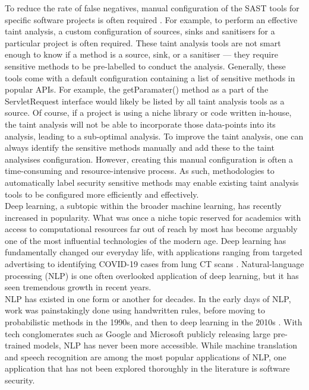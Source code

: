 \noindent
To reduce the rate of false negatives, manual configuration of the SAST tools for specific software projects is often required \cite{ZampettiFiorella2017HOSP}. For example, to perform an effective taint analysis, a custom configuration of sources, sinks and sanitisers for a particular project is often required. These taint analysis tools are not smart enough to know if a method is a source, sink, or a sanitiser --- they require sensitive methods to be pre-labelled to conduct the analysis. Generally, these tools come with a default configuration containing a list of sensitive methods in popular APIs. For example, the getParamater() method as a part of the ServletRequest interface would likely be listed by all taint analysis tools as a source. Of course, if a project is using a niche library or code written in-house, the taint analysis will not be able to incorporate those data-points into its analysis, leading to a sub-optimal analysis. To improve the taint analysis, one can always identify the sensitive methods manually and add these to the taint analysises configuration. However, creating this manual configuration is often a time-consuming and resource-intensive process. As such, methodologies to automatically label security sensitive methods may enable existing taint analysis tools to be configured more efficiently and effectively.\\

\noindent
Deep learning, a subtopic within the broader machine learning, has recently increased in popularity. What was once a niche topic reserved for academics with access to computational resources far out of reach by most has become arguably one of the most influential technologies of the modern age. Deep learning has fundamentally changed our everyday life, with applications ranging from targeted advertising to identifying COVID-19 cases from lung CT scans \cite{RAHIMZADEH2021102588}. Natural-language processing (NLP) is one often overlooked application of deep learning, but it has seen tremendous growth in recent years.\\

\noindent
NLP has existed in one form or another for decades. In the early days of NLP, work was painstakingly done using handwritten rules, before moving to probabilistic methods in the 1990s, and then to deep learning in the 2010s \cite{DengLi2018Dlin}. With tech conglomerates such as Google and Microsoft publicly releasing large pre-trained models, NLP has never been more accessible. While machine translation and speech recognition are among the most popular applications of NLP, one application that has not been explored thoroughly in the literature is software security.\\

